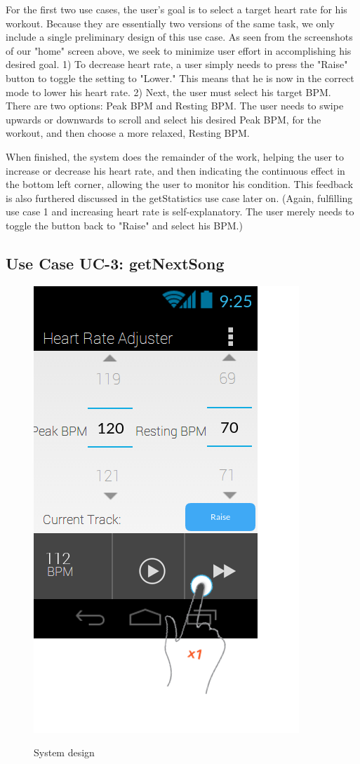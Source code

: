 \documentclass[letterpaper,english, 12pt]{scrreprt}
\begin{document}
For the first two use cases, the user's goal is to select a target heart rate for his workout. Because they are essentially two versions of the same task, we only include a single preliminary design of this use case. As seen from the screenshots of our "home" screen above, we seek to minimize user effort in accomplishing his desired goal. 1) To decrease heart rate, a user simply needs to press the "Raise" button to toggle the setting to "Lower." This means that he is now in the correct mode to lower his heart rate. 2) Next, the user must select his target BPM. There are two options: Peak BPM and Resting BPM. The user needs to swipe upwards or downwards to scroll and select his desired Peak BPM, for the workout, and then choose a more relaxed, Resting BPM.

When finished, the system does the remainder of the work, helping the user to increase or decrease his heart rate, and then indicating the continuous effect in the bottom left corner, allowing the user to monitor his condition. This feedback is also furthered discussed in the getStatistics use case later on. (Again, fulfilling use case 1 and increasing heart rate is self-explanatory. The user merely needs to toggle the button back to "Raise" and select his BPM.)

\subsection{Use Case UC-3: getNextSong}

\begin{figure}[H]
	\centering
	\includegraphics{img/Prelim_Design/PrelimDesign_2.png}\\
	\caption{System design}
\end{figure}
\end{document}
